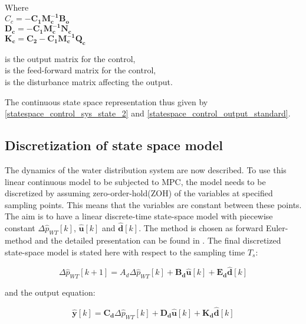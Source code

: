 \begin{minipage}[t]{0.40\textwidth}
Where\\
\hspace*{8mm} $C_c = -\pmb{C_1}\pmb{M_c^{-1}}\pmb{B_o} $ \\
\hspace*{8mm} $\pmb{D_c} = - \pmb{C_1}\pmb{M_c^{-1}}\pmb{N_c} $ \\
\hspace*{8mm} $\pmb{K_c} = \pmb{C_2} -\pmb{C_1}\pmb{M_c^{-1}}\pmb{Q_c} $
\end{minipage}
\begin{minipage}[t]{0.48\textwidth}
\vspace*{1mm}
is the output matrix for the control, \\
is the feed-forward matrix for the control, \\
is the disturbance matrix affecting the output.
\end{minipage} 

The continuous state space representation thus given by \eqref{statespace_control_sys_state_2} and \eqref{statespace_control_output_standard}.

\subsection{Discretization of state space model}
 \label{discrete_SS}
 
The dynamics of the water distribution system are now described. To use this linear continuous model to be subjected to MPC, the model needs to be discretized by assuming zero-order-hold(ZOH) of the variables at specified sampling points. This means that the variables are constant between these points. The aim is to have a linear discrete-time state-space model with piecewise constant $\Delta \hat{p}_{WT}[k]$, $\pmb{\hat{u}}[k]$ and $\pmb{\hat{d}}[k]$. The method is chosen as forward Euler-method and the detailed presentation can be found in . The final discretized state-space model is stated here with respect to the sampling time $T_s$: 

 \begin{equation}
\Delta \hat{p}_{WT} [k+1] = A_d \Delta \hat{p}_{WT}[k]  + \pmb{B_d} \pmb{\hat{u}}[k] + \pmb{E_d} \pmb{\hat{d}}[k] 
 \label{statespace_discrete_state}
\end{equation}

and the output equation:

\begin{equation}
  \pmb{\hat{y}}[k] = \pmb{C_d} \Delta \hat{p}_{WT}[k] + \pmb{D_d} \pmb{\hat{u}}[k] + \pmb{K_d} \pmb{\hat{d}}[k]
\label{statespace_control_output_discrete}
\end{equation}

